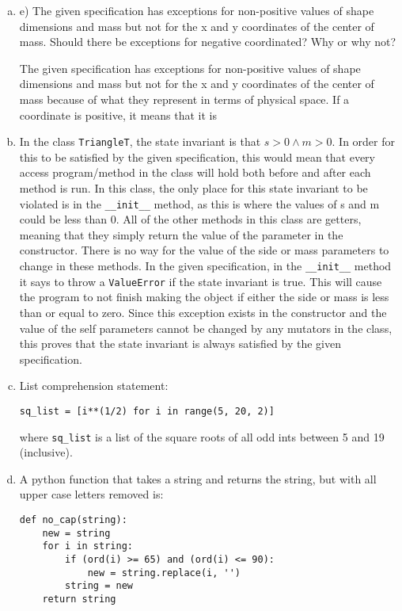 \documentclass[12pt]{article}
\begin{document}
\begin{enumerate}[a)]
\newpage

\item e) The given specification has exceptions for non-positive values of shape dimensions and mass but not for the x and y coordinates of the center of mass. Should there be exceptions for negative coordinated? Why or why not?

The given specification has exceptions for non-positive values of shape dimensions and mass but not for the x and y coordinates of the center of mass because of what they represent in terms of physical space. If a coordinate is positive, it means that it is 


\item In the class \verb|TriangleT|, the state invariant is that $s > 0 \land m > 0$. In order for this to be satisfied by the given specification, this would mean that every access program/method in the class will hold both before and after each method is run. In this class, the only place for this state invariant to be violated is in the \verb|__init__| method, as this is where the values of s and m could be less than 0. All of the other methods in this class are getters, meaning that they simply return the value of the parameter in the constructor. There is no way for the value of the side or mass parameters to change in these methods. In the given specification, in the \verb|__init__| method it says to throw a \verb|ValueError| if the state invariant is true. This will cause the program to not finish making the object if either the side or mass is less than or equal to zero. Since this exception exists in the constructor and the value of the self parameters cannot be changed by any mutators in the class, this proves that the state invariant is always satisfied by the given specification. 

\item List comprehension statement:

\begin{verbatim}
sq_list = [i**(1/2) for i in range(5, 20, 2)]
\end{verbatim}

where \verb|sq_list| is a list of the square roots of all odd ints between 5 and 19 (inclusive).

\item A python function that takes a string and returns the string, but with all upper case letters removed is:

\begin{verbatim}
def no_cap(string):
    new = string
    for i in string:
        if (ord(i) >= 65) and (ord(i) <= 90):
            new = string.replace(i, '')
        string = new
    return string
\end{verbatim}


\end{enumerate}
\end{document}
